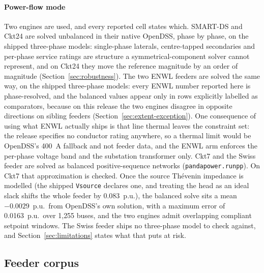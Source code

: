 \documentclass[review,authoryear,12pt]{elsarticle}
\begin{document}
\paragraph{Power-flow mode} Two engines are used, and every reported cell
states which. SMART-DS and Ckt24 are solved unbalanced in their native
OpenDSS, phase by phase, on the shipped three-phase models: single-phase
laterals, centre-tapped secondaries and per-phase service ratings are structure
a symmetrical-component solver cannot represent, and on Ckt24 they move the
reference magnitude by an order of magnitude (Section~\ref{sec:robustness}).
The two ENWL
feeders are solved the same way, on the shipped three-phase models: every ENWL
number reported here is phase-resolved, and the balanced values appear only in
rows explicitly labelled as comparators, because on this release the two
engines disagree in opposite directions on sibling feeders
(Section~\ref{sec:extent-exception}). One consequence of using what ENWL
actually ships is that line thermal leaves the constraint set: the release
specifies no conductor rating anywhere, so a thermal limit would be OpenDSS's
400~A fallback and not feeder data, and the ENWL arm enforces the per-phase
voltage band and the substation transformer only. Ckt7 and the Swiss feeder are
solved as balanced positive-sequence networks
(\texttt{pandapower.runpp}). On Ckt7 that approximation is checked. Once the
source Th\'evenin impedance is modelled (the shipped \texttt{Vsource} declares
one, and treating the head as an ideal slack shifts the whole feeder by
0.083~p.u.), the balanced solve sits a mean
$-0.0029$~p.u.\ from OpenDSS's own solution, with a maximum error of
0.0163~p.u.\ over 1{,}255 buses, and the two engines admit overlapping
compliant setpoint windows. The Swiss feeder ships no three-phase model to
check against, and Section~\ref{sec:limitations} states what that puts at risk.

\subsection{Feeder corpus}
\label{sec:corpus}
\end{document}
